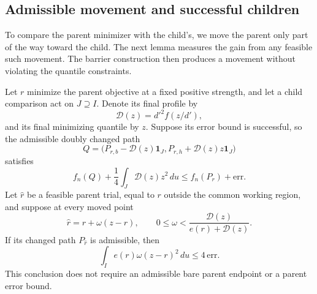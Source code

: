 \subsection{Admissible movement and successful children}

To compare the parent minimizer with the child's, we move the parent
only part of the way toward the child.  The next lemma measures the
gain from any feasible such movement.  The barrier construction then
produces a movement without violating the quantile constraints.

\begin{lemma}\label{reg:admissible-movement}
Let $r$ minimize the parent objective at a fixed positive strength,
and let a child comparison act on $J\supseteq I$.  Denote its final
profile by
\[
 \mathcal D(z)=d'^2 f(z/d'),
\]
and its final minimizing quantile by $z$.  Suppose its error bound is
successful, so the admissible doubly changed path
\[
 Q=\bigl(P_{r,b}-\mathcal D(z)\mathbf1_J,
              P_{r,h}+\mathcal D(z)z\mathbf1_J\bigr)
\]
satisfies
\[
 f_n(Q)+\frac14\int_J\mathcal D(z)z^2\,du
             \le f_n(P_r)+\mathrm{err}.
\]
Let $\widehat r$ be a feasible parent trial, equal to $r$ outside
the common working region, and suppose at every moved point
\[
 \widehat r=r+\omega(z-r),\qquad
 0\le\omega<\frac{\mathcal D(z)}{e(r)+\mathcal D(z)}.
\]
If its changed path $P_{\widehat r}$ is admissible, then
\[
 \int_I e(r)\omega(z-r)^2\,du\le4\,\mathrm{err}.
\]
This conclusion does not require an admissible bare parent endpoint
or a parent error bound.
\end{lemma}

